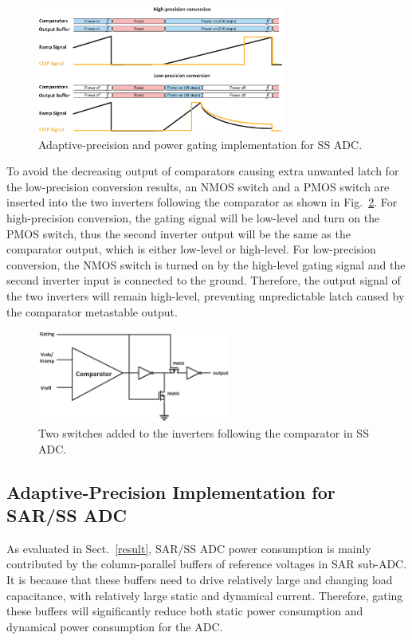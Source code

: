 \begin{figure}[htbp]
	\centerline{\includegraphics[width=3.2in]{./Figures/SS_pg.eps}}
	\caption{Adaptive-precision and power gating implementation for SS ADC.}
	\label{SS_pg}
\end{figure} 

To avoid the decreasing output of comparators causing extra unwanted latch for the low-precision conversion results, an NMOS switch and a PMOS switch are inserted into the two inverters following the comparator as shown in Fig.~\ref{MATE}. 
For high-precision conversion, the gating signal will be low-level and turn on the PMOS switch, thus the second inverter output will be the same as the comparator output, which is either low-level or high-level. 
For low-precision conversion, the NMOS switch is turned on by the high-level gating signal and the second inverter input is connected to the ground. Therefore, the output signal of the two inverters will remain high-level, preventing unpredictable latch caused by the comparator metastable output.

\begin{figure}[htbp]
	\centerline{\includegraphics[width=2.5in]{./Figures/MATE.eps}}
	\caption{Two switches added to the inverters following the comparator in SS ADC.}
	\label{MATE}
\end{figure} 

\subsection{Adaptive-Precision Implementation for SAR/SS ADC}\label{gating3}

As evaluated in Sect.~\ref{result}, SAR/SS ADC power consumption is mainly contributed by the column-parallel buffers of reference voltages in SAR sub-ADC.
It is because that these buffers need to drive relatively large and changing load capacitance, with relatively large static and dynamical current.
Therefore, gating these buffers will significantly reduce both static power consumption and dynamical power consumption for the ADC.

